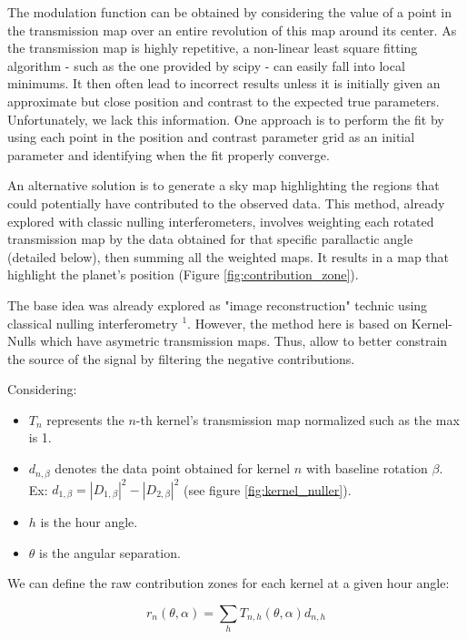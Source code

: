 \documentclass[]{spie}  %
\begin{document}
The modulation function can be obtained by considering the value of a point in the transmission map over an entire revolution of this map around its center. As the transmission map is highly repetitive, a non-linear least square fitting algorithm - such as the one provided by scipy - can easily fall into local minimums. It then often lead to incorrect results unless it is initially given an approximate but close position and contrast to the expected true parameters. Unfortunately, we lack this information. One approach is to perform the fit by using each point in the position and contrast parameter grid as an initial parameter and identifying when the fit properly converge.

An alternative solution is to generate a sky map highlighting the regions that could potentially have contributed to the observed data. This method, already explored with classic nulling interferometers\cite{Image reconstruction}, involves weighting each rotated transmission map by the data obtained for that specific parallactic angle (detailed below), then summing all the weighted maps. It results in a map that highlight the planet's position (Figure \ref{fig:contribution_zone}).

The base idea was already explored as "image reconstruction" technic using classical nulling interferometry $^1$. However, the method here is based on Kernel-Nulls which have asymetric transmission maps. Thus, allow to better constrain the source of the signal by filtering the negative contributions.

Considering:
\begin{itemize}
\item $T_{n}$ represents the $n$-th kernel's transmission map normalized such as the max is 1.
\item $d_{n,\beta}$ denotes the data point obtained for kernel $n$ with baseline rotation $\beta$. Ex: $d_{1,\beta} = |D_{1,\beta}|^2 - |D_{2,\beta}|^2$ (see figure \ref{fig:kernel_nuller}).
\item $h$ is the hour angle.
\item $\theta$ is the angular separation.
\end{itemize}

We can define the raw contribution zones for each kernel at a given hour angle:

\begin{equation}
    \label{eq:raw_kernel}
    r_n(\theta, \alpha) = \sum_h T_{n,h}(\theta,\alpha) d_{n,h}
\end{equation}
\end{document}
